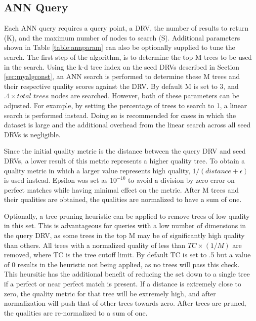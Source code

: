 \subsection{ANN Query}

Each ANN query requires a query point, a DRV, the number of results to return (K), and the maximum number of nodes to search (S).  Additional parameters shown in Table \ref{table:annparam} can also be optionally supplied to tune the search.  The first step of the algorithm, is to determine the top M trees to be used in the search.  Using the k-d tree index on the seed DRVs described in Section \ref{sec:myalgconst}, an ANN search is performed to determine these M trees and their respective quality scores against the DRV.  By default M is set to 3, and $.4 \times {total\_trees}$ nodes are searched.  However, both of these parameters can be adjusted.  For example, by setting the percentage of trees to search to 1, a linear search is performed instead.  Doing so is recommended for cases in which the dataset is large and the additional overhead from the linear search across all seed DRVs is negligible.

Since the initial quality metric is the distance between the query DRV and seed DRVs, a lower result of this metric represents a higher quality tree.  To obtain a quality metric in which a larger value represents high quality, $1/(distance + \epsilon)$ is used instead.  Epsilon was set as $10^{-10}$ to avoid a division by zero error on perfect matches while having minimal effect on the metric.  After M trees and their qualities are obtained, the qualities are normalized to have a sum of one.

Optionally, a tree pruning heuristic can be applied to remove trees of low quality in this set.  This is advantageous for queries with a low number of dimensions in the query DRV, as some trees in the top M may be of significantly high quality than others.  All trees with a normalized quality of less than $TC\times(1/M)$ are removed, where TC is the tree cutoff limit.  By default TC is set to .5 but a value of 0 results in the heuristic not being applied, as no trees will pass this check.  This heursitic has the additional benefit of reducing the set down to a single tree if a perfect or near perfect match is present.  If a distance is extremely close to zero, the quality metric for that tree will be extremely high, and after normalization will push that of other trees towards zero.  After trees are pruned, the qualities are re-normalized to a sum of one.

